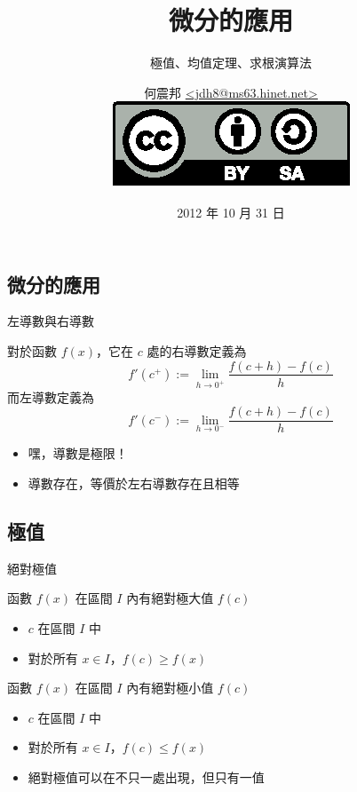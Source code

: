 \documentclass{beamer}
\begin{document}
\begin{CJK}{UTF8}{bsmi}
\title{微分的應用}
\subtitle{極值、均值定理、求根演算法}
\author[何震邦]{何震邦 \href{mailto:jdh8@ms63.hinet.net}{\textless jdh8@ms63.hinet.net\textgreater}\\
    \href{http://creativecommons.org/licenses/by-sa/3.0/tw/deed.zh\textunderscore TW}{\includegraphics{by-sa.eps}}}
\date{2012 年 10 月 31 日}
\maketitle

\section{微分的應用}
\begin{frame}{左導數與右導數}
  \begin{definition}
    對於函數 $f(x)$，它在 $c$ 處的右導數定義為
    \[f'(c^+) := \lim_{h\to0^+} \frac{f(c+h) - f(c)}{h}\]
    而左導數定義為
    \[f'(c^-) := \lim_{h\to0^-} \frac{f(c+h) - f(c)}{h}\]
  \end{definition}
  \begin{itemize}
    \item 嘿，導數是極限！
    \item 導數存在，等價於左右導數存在且相等
  \end{itemize}
\end{frame}

\subsection{極值}
\begin{frame}{絕對極值}
  \begin{definition}
    函數 $f(x)$ 在區間 $I$ 內有絕對極大值 $f(c)$
    \begin{itemize}
      \item $c$ 在區間 $I$ 中
      \item 對於所有 $x \in I$，$f(c) \ge f(x)$
    \end{itemize}
  \end{definition}
  \begin{definition}
    函數 $f(x)$ 在區間 $I$ 內有絕對極小值 $f(c)$
    \begin{itemize}
      \item $c$ 在區間 $I$ 中
      \item 對於所有 $x \in I$，$f(c) \le f(x)$
    \end{itemize}
  \end{definition}
  \begin{itemize}
    \item 絕對極值可以在不只一處出現，但只有一值
  \end{itemize}
\end{frame}


\end{CJK}
\end{document}

